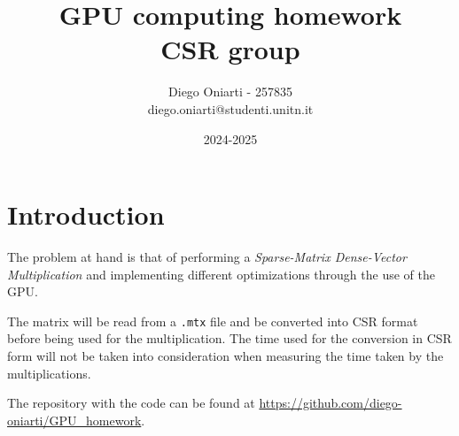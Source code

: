 \documentclass{article}
\title{
    GPU computing homework\\
\large CSR group}
\author{Diego Oniarti - 257835 \\ diego.oniarti@studenti.unitn.it}
\date{2024-2025}
\begin{document}
\maketitle

\section{Introduction}
The problem at hand is that of performing a \textit{Sparse-Matrix Dense-Vector Multiplication} and implementing different optimizations through the use of the GPU.

The matrix will be read from a \texttt{.mtx} file and be converted into CSR format before being used for the multiplication. The time used for the conversion in CSR form will not be taken into consideration when measuring the time taken by the multiplications.

The repository with the code can be found at \url{https://github.com/diego-oniarti/GPU_homework}.

\end{document}
